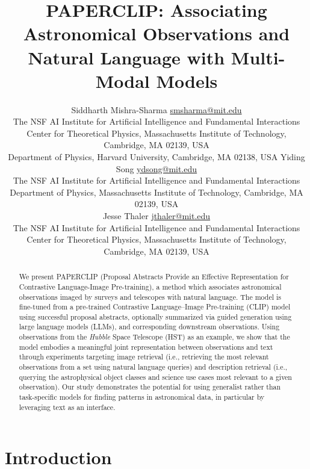 \documentclass[10pt]{article} %
\title{\textsc{PAPERCLIP}: Associating Astronomical Observations and Natural Language with Multi-Modal Models}
\author{\name Siddharth Mishra-Sharma \email \href{mailto:smsharma@mit.edu}{smsharma@mit.edu} \\
      \addr The NSF AI Institute for Artificial Intelligence and Fundamental Interactions\\
      Center for Theoretical Physics, Massachusetts Institute of Technology, Cambridge, MA 02139, USA \\
      Department of Physics, Harvard University, Cambridge, MA 02138, USA
      \AND
      \name Yiding Song \email \href{mailto:ydsong@mit.edu}{ydsong@mit.edu} \\
      \addr The NSF AI Institute for Artificial Intelligence and Fundamental Interactions\\
      Department of Physics, Massachusetts Institute of Technology, Cambridge, MA 02139, USA \\
      \AND
      \name Jesse Thaler \email \href{mailto:jthaler@mit.edu}{jthaler@mit.edu} \\
      \addr The NSF AI Institute for Artificial Intelligence and Fundamental Interactions\\
      Center for Theoretical Physics, Massachusetts Institute of Technology, Cambridge, MA 02139, USA \\
}
\newcommand{\SM}[1]{\textcolor{blue}{[SM: #1]}}
\newcommand{\hubble}{\emph{Hubble}\xspace}
\begin{document}
\maketitle

\thispagestyle{firstpage}

\begin{abstract}
We present PAPERCLIP (Proposal Abstracts Provide an Effective Representation for Contrastive Language-Image Pre-training), a method which associates astronomical observations imaged by surveys and telescopes with natural language. The model is fine-tuned from a pre-trained Contrastive Language–Image Pre-training (CLIP) model using successful proposal abstracts, optionally summarized via guided generation using large language models (LLMs), and corresponding downstream observations. Using observations from the \hubble Space Telescope (HST) as an example, we show that the model embodies a meaningful joint representation between observations and text through experiments targeting image retrieval (i.e., retrieving the most relevant observations from a set using natural language queries) and description retrieval (i.e., querying the astrophysical object classes and science use cases most relevant to a given observation). Our study demonstrates the potential for using generalist rather than task-specific models for finding patterns in astronomical data, in particular by leveraging text as an interface.
\end{abstract}

\tableofcontents

\section{Introduction}
\label{sec:intro}

\end{document}
